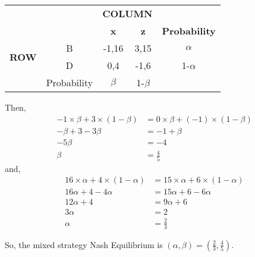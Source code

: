 \documentclass[a4paper,12pt]{article}
\begin{document}
\begin{enumerate}
\begin{table}[H]
\centering
\begin{tabular}{@{}ccccc@{}}
\toprule
\multicolumn{2}{c}{} & \multicolumn{2}{c}{\bfseries COLUMN}\\
\multicolumn{2}{c}{} & \textbf{x} & \textbf{z} & \textbf{Probability}\\
\multirow{2}{*}{\bfseries ROW} & B & -1,16 & 3,15 & $\alpha$\\
 & D & 0,4 & -1,6 & 1-$\alpha$\\
 & Probability & $\beta$ & 1-$\beta$\\
 \bottomrule
\end{tabular}
\end{table}

Then,
\begin{align*}
-1\times\beta + 3\times(1-\beta)  & = 0\times \beta + (-1)\times(1-\beta)\\
-\beta+3-3\beta &=-1+\beta\\
-5\beta &=-4\\
\beta &=\frac{4}{5}
\end{align*}
and,
\begin{align*}
16\times\alpha+4\times(1-\alpha) &=15\times \alpha+6\times(1-\alpha)\\
16\alpha+4-4\alpha &=15\alpha+6-6\alpha\\
12\alpha+4 &=9\alpha+6\\
3\alpha &=2\\
\alpha &=\frac{2}{3}
\end{align*}

So, the mixed strategy Nash Equilibrium is $(\alpha,\beta)=(\frac{2}{3},\frac{4}{5})$.
\end{enumerate}
\end{document}
